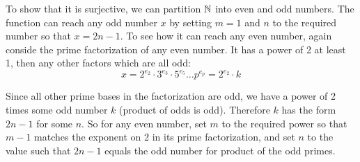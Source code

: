 \documentclass{article}
\begin{document}
To show that it is surjective, we can partition $\mathbb{N}$ into even and odd numbers. The function can reach any odd number $x$ by setting $m = 1$ and $n$ to the required number so that $x = 2n -1$. To see how it can reach any even number, again conside the prime factorization of any even number. It has a power of 2 at least 1, then any other factors which are all odd:
$$x = 2^{e_2}\cdot 3^{e_3}\cdot 5^{e_5}\ldots p^{e_p}= 2^{e_2}\cdot k$$

Since all other prime bases in the factorization are odd, we have a power of 2 times some odd number $k$ (product of odds is odd). Therefore $k$ has the form $2n - 1$ for some $n$. So for any even number, set $m$ to the required power so that $m - 1$ matches the exponent on 2 in its prime factorization, and set $n$ to the value such that $2n - 1$ equals the odd number for product of the odd primes.
\end{document}
